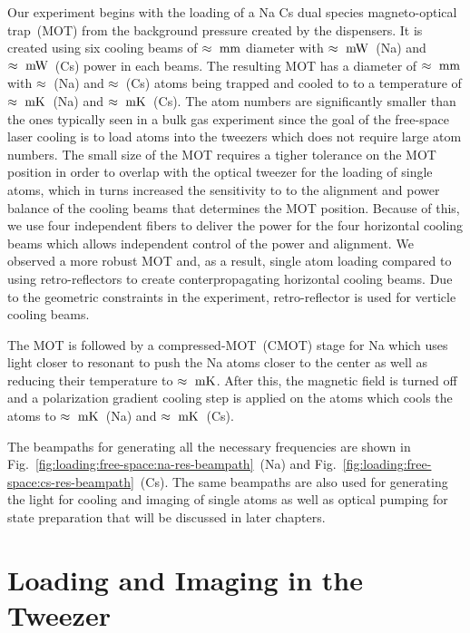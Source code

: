 Our experiment begins with the loading of a Na Cs dual species magneto-optical trap~(MOT)
from the background pressure created by the dispensers.
It is created using six cooling beams of $\approx\todo{number}~\mathrm{mm}$ diameter
with $\approx\todo{number}~\mathrm{mW}$~(Na) and $\approx\todo{number}~\mathrm{mW}$~(Cs)
power in each beams.
The resulting MOT has a diameter of $\approx\todo{number}~\mathrm{mm}$
with $\approx\todo{number}$~(Na) and $\approx\todo{number}$~(Cs) atoms being trapped
and cooled to to a temperature of $\approx\todo{number}~\mathrm{mK}$~(Na)
and $\approx\todo{number}~\mathrm{mK}$~(Cs).
The atom numbers are significantly smaller than the ones typically seen in a bulk gas experiment
since the goal of the free-space laser cooling is to load atoms into the tweezers
which does not require large atom numbers.
The small size of the MOT requires a tigher tolerance on the MOT position
in order to overlap with the optical tweezer for the loading of single atoms,
which in turns increased the sensitivity to to the alignment
and power balance of the cooling beams that determines the MOT position.
Because of this, we use four independent fibers to deliver the power
for the four horizontal cooling beams which allows independent control
of the power and alignment.
We observed a more robust MOT and, as a result, single atom loading
compared to using retro-reflectors to create conterpropagating horizontal cooling beams.
Due to the geometric constraints in the experiment,
retro-reflector is used for verticle cooling beams.

The MOT is followed by a compressed-MOT~(CMOT) stage for Na
which uses light closer to resonant to push the Na atoms closer to the center
as well as reducing their temperature to $\approx\todo{number}~\mathrm{mK}$.
After this, the magnetic field is turned off and
a polarization gradient cooling step is applied on the atoms
which cools the atoms to $\approx\todo{number}~\mathrm{mK}$~(Na)
and $\approx\todo{number}~\mathrm{mK}$~(Cs).

The beampaths for generating all the necessary frequencies are shown in
Fig.~\ref{fig:loading:free-space:na-res-beampath}~(Na) and
Fig.~\ref{fig:loading:free-space:cs-res-beampath}~(Cs).
The same beampaths are also used for generating the light for cooling
and imaging of single atoms as well as optical pumping for state preparation
that will be discussed in later chapters.

\section{Loading and Imaging in the Tweezer}
\label{ch:loading:loading}

